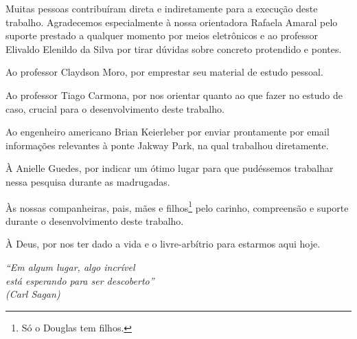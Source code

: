 \documentclass[
	12pt,				%
	openright,			%
	oneside,			%
	a4paper,			%
	chapter=TITLE,		%
	english,			%
	french,				%
	spanish,			%
	brazil				%
	]{abntex2}
\begin{document}
%
\begin{agradecimentos}
Muitas pessoas contribuíram direta e indiretamente para a execução deste trabalho. Agradecemos especialmente à nossa orientadora Rafaela Amaral pelo suporte prestado a qualquer momento por meios eletrônicos e ao professor Elivaldo Elenildo da Silva por tirar dúvidas sobre concreto protendido e pontes.

Ao professor Claydson Moro, por emprestar seu material de estudo pessoal.

Ao professor Tiago Carmona, por nos orientar quanto ao que fazer no estudo de caso, crucial para o desenvolvimento deste trabalho.

Ao engenheiro americano Brian Keierleber por enviar prontamente por email informações relevantes à ponte Jakway Park, na qual trabalhou diretamente.

À Anielle Guedes, por indicar um ótimo lugar para que pudéssemos trabalhar nessa pesquisa durante as madrugadas.

Às nossas companheiras, pais, mães e filhos\footnote{Só o Douglas tem filhos.} pelo carinho, compreensão e suporte durante o desenvolvimento deste trabalho.

À Deus, por nos ter dado a vida e o livre-arbítrio para estarmos aqui hoje.

\end{agradecimentos}

\begin{epigrafe}
    \vspace*{\fill}
	\begin{flushright}
		\textit{``Em algum lugar, algo incrível\\
		 está esperando para ser descoberto''  \\
		(Carl Sagan)}
	\end{flushright}
\end{epigrafe}
\end{document}

